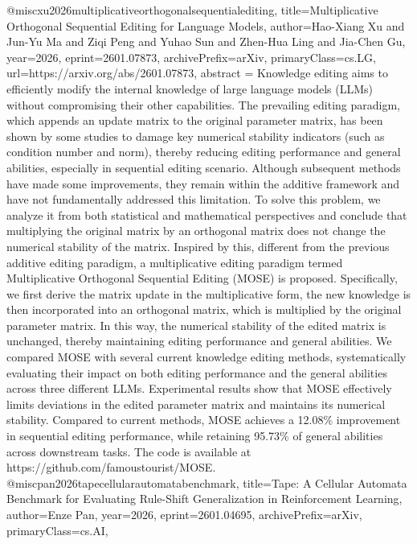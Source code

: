 {}@misc{xu2026multiplicativeorthogonalsequentialediting,
      title={Multiplicative Orthogonal Sequential Editing for Language Models}, 
      author={Hao-Xiang Xu and Jun-Yu Ma and Ziqi Peng and Yuhao Sun and Zhen-Hua Ling and Jia-Chen Gu},
      year={2026},
      eprint={2601.07873},
      archivePrefix={arXiv},
      primaryClass={cs.LG},
      url={https://arxiv.org/abs/2601.07873},
      abstract = {Knowledge editing aims to efficiently modify the internal knowledge of large language models (LLMs) without compromising their other capabilities. The prevailing editing paradigm, which appends an update matrix to the original parameter matrix, has been shown by some studies to damage key numerical stability indicators (such as condition number and norm), thereby reducing editing performance and general abilities, especially in sequential editing scenario. Although subsequent methods have made some improvements, they remain within the additive framework and have not fundamentally addressed this limitation. To solve this problem, we analyze it from both statistical and mathematical perspectives and conclude that multiplying the original matrix by an orthogonal matrix does not change the numerical stability of the matrix. Inspired by this, different from the previous additive editing paradigm, a multiplicative editing paradigm termed Multiplicative Orthogonal Sequential Editing (MOSE) is proposed. Specifically, we first derive the matrix update in the multiplicative form, the new knowledge is then incorporated into an orthogonal matrix, which is multiplied by the original parameter matrix. In this way, the numerical stability of the edited matrix is unchanged, thereby maintaining editing performance and general abilities. We compared MOSE with several current knowledge editing methods, systematically evaluating their impact on both editing performance and the general abilities across three different LLMs. Experimental results show that MOSE effectively limits deviations in the edited parameter matrix and maintains its numerical stability. Compared to current methods, MOSE achieves a 12.08\% improvement in sequential editing performance, while retaining 95.73\% of general abilities across downstream tasks. The code is available at https://github.com/famoustourist/MOSE.}
}@misc{pan2026tapecellularautomatabenchmark,
      title={Tape: A Cellular Automata Benchmark for Evaluating Rule-Shift Generalization in Reinforcement Learning}, 
      author={Enze Pan},
      year={2026},
      eprint={2601.04695},
      archivePrefix={arXiv},
      primaryClass={cs.AI},
}
